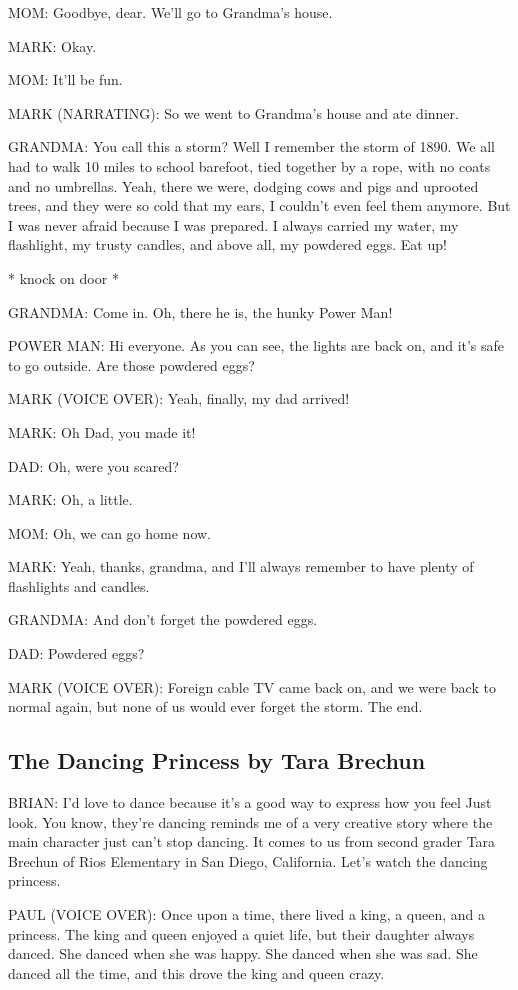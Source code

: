 MOM:
Goodbye, dear.
We'll go to Grandma's house.

MARK:
Okay.

MOM:
It'll be fun.

MARK (NARRATING):
So we went to Grandma's house and ate dinner.

GRANDMA:
You call this a storm?
Well I remember the storm of 1890.
We all had to walk 10 miles to school barefoot, tied together by a rope, with no coats and no umbrellas.
Yeah, there we were, dodging cows and pigs and uprooted trees, and they were so cold that my ears, I couldn't even feel them anymore.
But I was never afraid because I was prepared.
I always carried my water, my flashlight, my trusty candles, and above all, my powdered eggs.
Eat up!

* knock on door *

GRANDMA:
Come in.
Oh, there he is, the hunky Power Man!

POWER MAN:
Hi everyone.
As you can see, the lights are back on, and it's safe to go outside.
Are those powdered eggs?

MARK (VOICE OVER):
Yeah, finally, my dad arrived!

MARK:
Oh Dad, you made it!

DAD:
Oh, were you scared?

MARK:
Oh, a little.

MOM:
Oh, we can go home now.

MARK:
Yeah, thanks, grandma, and I'll always remember to have plenty of flashlights and candles.

GRANDMA:
And don't forget the powdered eggs.

DAD:
Powdered eggs?

MARK (VOICE OVER):
Foreign cable TV came back on, and we were back to normal again, but none of us would ever forget the storm.
The end.

\subsection{The Dancing Princess by Tara Brechun}

BRIAN:
I'd love to dance because it's a good way to express how you feel
Just look.
You know, they're dancing reminds me of a very creative story where the main character just can't stop dancing.
It comes to us from second grader Tara Brechun of Rios Elementary in San Diego, California.
Let's watch the dancing princess.

PAUL (VOICE OVER):
Once upon a time, there lived a king, a queen, and a princess.
The king and queen enjoyed a quiet life, but their daughter always danced.
She danced when she was happy.
She danced when she was sad.
She danced all the time, and this drove the king and queen crazy.

